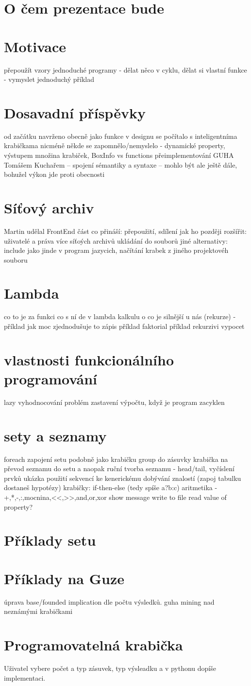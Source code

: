 \documentclass{article}
\author{Michal Kováč}
\begin{document}
\section{O čem prezentace bude}
\section{Motivace}
přepoužít vzory
jednoduché programy - dělat něco v cyklu, 
dělat si vlastní funkce - vymyslet jednoduchý příklad
\section{Dosavadní příspěvky}
od začátku navrženo obecně jako funkce
v designu se počítalo s inteligentníma krabičkama
nicméně někde se zapomnělo/nemyslelo - dynamické property, výstupem množina krabiček, BoxInfo vs functions
přeimplementování GUHA Tomášem Kuchařem -- spojení sémantiky a syntaxe -- mohlo být ale ještě dále, bohužel výkon jde proti obecnosti 
\section{Síťový archiv}
Martin udělal FrontEnd část
co přináší: přepoužití, sdílení
jak ho později rozšířit:
uživatelé a práva
více síťoých archivů
ukládání do souborů
jiné alternativy: include jako jinde v program jazycich, načítání krabek z jiného projektovéh souboru 
\section{Lambda}
co to je za funkci
co s ní de v lambda kalkulu
o co je silnější u nás (rekurze) - příklad jak moc zjednodušuje to zápis
příklad faktorial
příklad rekurzivi vypocet
\section{vlastnosti funkcionálního programování}
lazy vyhodnocování
problém zastavení výpočtu, když je program zacyklen
\section{sety a seznamy}
foreach
zapojení setu podobně jako krabičku group do zásuvky
krabička na převod seznamu do setu a naopak
ruční tvorba seznamu - head/tail, vyčíslení prvků
ukázka použití sekvencí ke kenerickému dobývání znalostí (zapoj tabulku dostaneš hypotézy)
krabičky:
if-then-else (tedy spíše a?b:c)
aritmetika - +,*,-,:,mocnina,<<,>>,and,or,xor
show message
write to file
read value of property?
\section{Příklady setu}
\section{Příklady na Guze}
úprava base/founded implication dle počtu výsledků.
guha mining nad neznámými krabičkami
\section{Programovatelná krabička}
Uživatel vybere počet a typ zásuvek, typ výsleadku a v pythonu dopíše implementaci.
\end{document}
